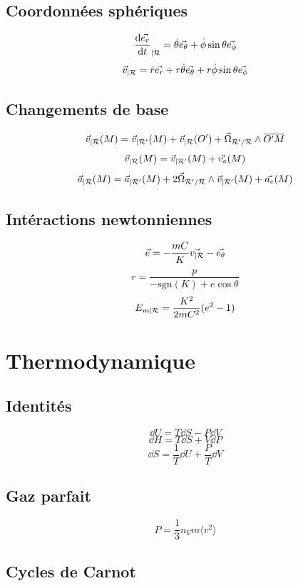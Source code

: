 \documentclass[]{article}
\begin{document}
\subsection*{Coordonnées sphériques}

\[ \frac{\text{d} \vec{e_r}}{\text{d}t}_{|\mathcal{R}} = \dot{\theta} \vec{e_{\theta}} + \dot{\phi}\sin \theta \vec{e_{\phi}} \]
\[ \vec{v}_{|\mathcal{R}} = \dot{r} \vec{e_r} + r \dot{\theta} \vec{e_{\theta}} + r \dot{\phi} \sin \theta \vec{e_{\phi}} \]

\subsection*{Changements de base}
\[ \vec{v}_{|\mathcal{R}} (M) = \vec{v}_{|\mathcal{R} '} (M) + \vec{v}_{|\mathcal{R}} (O') + \vec{\Omega}_{\mathcal{R}' / \mathcal{R}} \wedge \overline{O'M} \]
\[ \vec{v}_{|\mathcal{R}} (M) = \vec{v}_{|\mathcal{R} '} (M) + \vec{v_{e}} (M) \]
\[ \vec{a}_{|\mathcal{R}}(M) = \vec{a}_{|\mathcal{R} '}(M) + 2 \vec{\Omega}_{\mathcal{R}' / \mathcal{R}}\wedge \vec{v}_{|\mathcal{R} '} (M) + \vec{a_e}(M) \]

\subsection*{Intéractions newtonniennes}

\[ \vec{e} = -\frac{mC}{K}\vec{v_{|\mathcal{R}}} - \vec{e_{\theta}} \]
\[ r = \frac{p}{-\text{sgn}(K) + e\cos{\theta}} \]
\[ E_{m|\mathcal{R}} = \frac{K^2}{2mC^2}(e^2-1) \]

\section{Thermodynamique}

\subsection*{Identités}
\[ \dd U = T \dd S - P \dd V \]
\[ \dd H = T \dd S + V \dd P \]
\[ \dd S = \frac{1}{T}\dd U + \frac{P}{T} \dd V \]

\subsection*{Gaz parfait}

\[ P = \frac{1}{3}n_Vm \langle v^2 \rangle \]

\subsection*{Cycles de Carnot}
\end{document}
